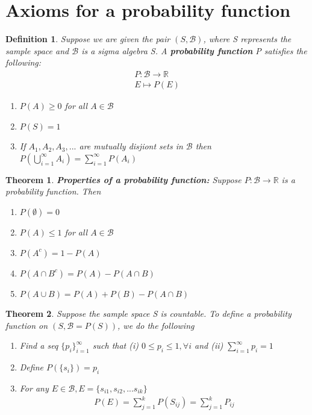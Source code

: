 \documentclass[11pt,oneside]{book}
\theoremstyle{break}
\theoremstyle{break}
\newtheorem{thm}{Theorem}[section]
\newtheorem{defn}{Definition}[corL]
\newcommand{\lr}[1]{\left(#1\right)}
\begin{document}
	\section[Axioms for a probability function]{\color{Periwinkle}Axioms for a probability function\color{black}}
	\begin{defn}
Suppose we are given the pair $(S,\mathcal{B})$, where S represents the sample space and $\mathcal{B}$ is a sigma algebra S. 
	A \textbf{probability function} P satisfies the following:\begin{align*}
	P:\mathcal{B}\rightarrow \mathbb{R}\\
	E \mapsto P(E)
	\end{align*}
	\begin{enumerate}
	\item $P(A)\geq 0$ for all $A\in \mathcal{B}$
	\item $P(S)=1$
	\item If $A_1,A_2,A_3,...$ are mutually disjiont sets in $\mathcal{B}$ then $P\lr{\bigcup_{i=1}^{\infty}A_i}=\sum_{i=1}^{\infty}P(A_i)$
	\end{enumerate}
	\end{defn}
	\begin{thm}
	\textbf{Properties of a probability function:} Suppose $P:\mathcal{B}\rightarrow \mathbb{R}$ is a probability function. Then\begin{enumerate}
	\item $P(\emptyset)=0$
	\item $P(A)\leq 1$ for all $A\in \mathcal{B}$
	\item $P(A^c)=1-P(A)$
	\item $P(A\cap B^c)=P(A)-P(A\cap B)$
	\item $P(A\cup B)=P(A)+P(B)-P(A\cap B)$
	\end{enumerate}
	\end{thm}
	\begin{thm}
	Suppose the sample space S is countable. To define a probability function on $(S,\mathcal{B}=P(S))$, we do the following \begin{enumerate}
	\item Find a seq $\{p_i\}_{i=1}^{\infty}$ such that (i) $0\leq p_i\leq 1, \forall i$ and (ii) $\sum_{i=1}^{\infty}p_i=1$
	\item Define $P(\{s_i\})=p_i$
	\item For any $E\in \mathcal{B}, E=\{s_{i1},s_{i2},...s_{ik}\}$ \begin{align*}
		 P(E)=\sum_{j=1}^{k}P(S_{ij})=\sum_{j=1}^{k}P_{ij}
		 \end{align*}
	\end{enumerate}
	\end{thm}
\end{document}
